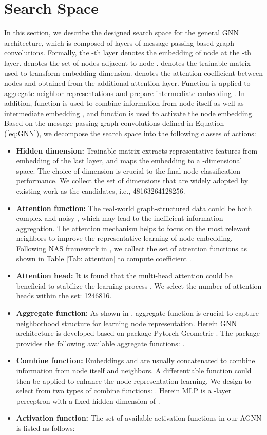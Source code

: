 \documentclass[sigconf]{acmart}
\begin{document}
\section{Search Space}
In this section, we describe the designed search space for the general GNN architecture, which is composed of layers of message-passing based graph convolutions. Formally, the -th layer 
 denotes the embedding of node  at the -th layer.  denotes the set of nodes adjacent to node .  denotes the trainable matrix used to transform embedding dimension.  denotes the attention coefficient between nodes  and  obtained from the additional attention layer. Function  is applied to aggregate neighbor representations and prepare intermediate embedding . In addition, function  is used to combine information from node itself as well as intermediate embedding , and function  is used to activate the node embedding. Based on the message-passing graph convolutions defined in Equation (\ref{eq:GNN}), we decompose the search space into the following  classes of actions:
\begin{itemize}
    \item \textbf{Hidden dimension:} Trainable matrix  extracts representative features from embedding  of the last layer, and maps the embedding to a -dimensional space. The choice of dimension  is crucial to the final node classification performance. We collect the set of dimensions that are widely adopted by existing work as the candidates, i.e., 48163264128256.
    \item \textbf{Attention function:} The real-world graph-structured data could be both complex and noisy \cite{lee2018attention}, which may lead to the inefficient information aggregation. The attention mechanism helps to focus on the most relevant neighbors to improve the representative learning of node embedding. Following NAS framework in \cite{gao2019graphnas}, we collect the set of attention functions as shown in Table \ref{Tab: attention} to compute coefficient .
    \item \textbf{Attention head: } It is found that the multi-head attention could be beneficial to stabilize the learning process \cite{velickovic2017graph,vaswani2017attention}. We select the number of attention heads within the set: 1246816.
    \item \textbf{Aggregate function:} As shown in \cite{howpowerful}, aggregate function is crucial to capture neighborhood structure for learning node representation. Herein GNN architecture is developed based on package Pytorch Geometric \cite{Fey/Lenssen/2019}.
The package provides the following available aggregate functions: .
    \item \textbf{Combine function:} Embeddings  and  are usually concatenated to combine information from node itself and neighbors. A differentiable function could then be applied to enhance the node representation learning. We design to select from two types of combine functions: . Herein MLP is a -layer perceptron with a fixed hidden dimension of . 
\item \textbf{Activation function: } The set of available activation functions in our AGNN is listed as follows: 
\end{itemize}
\end{document}

